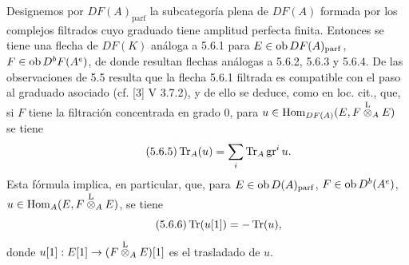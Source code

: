 Designemos por $DF(A)_{\mathrm{parf}}$ la subcategoría plena de $DF(A)$ formada por los complejos filtrados cuyo graduado tiene amplitud perfecta finita. Entonces se tiene una flecha de $DF(K)$ análoga a 5.6.1 para $E\in\operatorname{ob} DF(A)_{\mathrm{parf}}$, $F\in\operatorname{ob} D^bF(A^e)$, de donde resultan flechas análogas a 5.6.2, 5.6.3 y 5.6.4. De las observaciones de 5.5 resulta que la flecha 5.6.1 filtrada es compatible con el paso al graduado asociado (cf. [3] V 3.7.2), y de ello se deduce, como en loc. cit., que, si $F$ tiene la filtración concentrada en grado $0$, para $u\in\operatorname{Hom}_{DF(A)}(E,F\overset{\mathrm L}{\otimes}_AE)$ se tiene
\begin{equation}\tag{5.6.5}
\operatorname{Tr}_A(u)=\sum_i\operatorname{Tr}_A\operatorname{gr}^i u.
\end{equation}
Esta fórmula implica, en particular, que, para $E\in\operatorname{ob} D(A)_{\mathrm{parf}}$, $F\in\operatorname{ob} D^b(A^e)$, $u\in\operatorname{Hom}_A(E,F\overset{\mathrm L}{\otimes}_AE)$, se tiene
\begin{equation}\tag{5.6.6}
\operatorname{Tr}(u[1])=-\operatorname{Tr}(u),
\end{equation}
donde $u[1]:E[1]\to(F\overset{\mathrm L}{\otimes}_AE)[1]$ es el trasladado de $u$.
